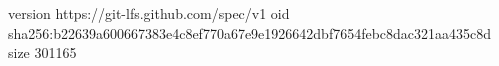 version https://git-lfs.github.com/spec/v1
oid sha256:b22639a600667383e4c8ef770a67e9e1926642dbf7654febc8dac321aa435c8d
size 301165
